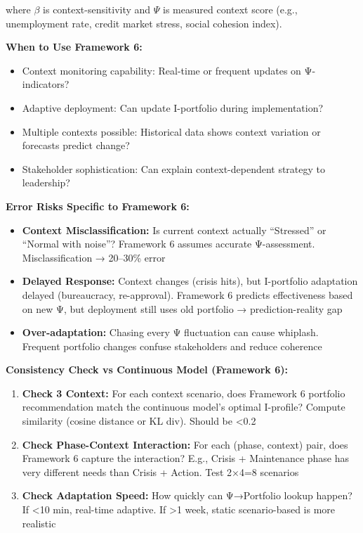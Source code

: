 where $\beta$ is context-sensitivity and $\Psi$ is measured context score (e.g., unemployment rate, credit market stress, social cohesion index).

\textbf{When to Use Framework 6:}
\begin{itemize}[nosep]
\item Context monitoring capability: Real-time or frequent updates on Ψ-indicators?
\item Adaptive deployment: Can update I-portfolio during implementation?
\item Multiple contexts possible: Historical data shows context variation or forecasts predict change?
\item Stakeholder sophistication: Can explain context-dependent strategy to leadership?
\end{itemize}

\textbf{Error Risks Specific to Framework 6:}
\begin{itemize}[nosep]
\item \textbf{Context Misclassification:} Is current context actually ``Stressed'' or ``Normal with noise''? Framework 6 assumes accurate Ψ-assessment. Misclassification → 20--30\% error
\item \textbf{Delayed Response:} Context changes (crisis hits), but I-portfolio adaptation delayed (bureaucracy, re-approval). Framework 6 predicts effectiveness based on new Ψ, but deployment still uses old portfolio → prediction-reality gap
\item \textbf{Over-adaptation:} Chasing every Ψ fluctuation can cause whiplash. Frequent portfolio changes confuse stakeholders and reduce coherence
\end{itemize}

\textbf{Consistency Check vs Continuous Model (Framework 6):}
\begin{enumerate}[nosep]
\item \textbf{Check 3 Context:} For each context scenario, does Framework 6 portfolio recommendation match the continuous model's optimal I-profile? Compute similarity (cosine distance or KL div). Should be <0.2
\item \textbf{Check Phase-Context Interaction:} For each (phase, context) pair, does Framework 6 capture the interaction? E.g., Crisis + Maintenance phase has very different needs than Crisis + Action. Test 2×4=8 scenarios
\item \textbf{Check Adaptation Speed:} How quickly can Ψ→Portfolio lookup happen? If <10 min, real-time adaptive. If >1 week, static scenario-based is more realistic
\end{enumerate}

